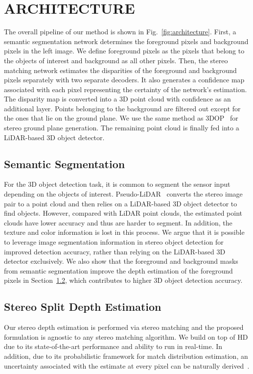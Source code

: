 \documentclass[letterpaper, 10 pt, conference]{ieeeconf}
\begin{document}
\section{ARCHITECTURE}\label{Approach}
The overall pipeline of our method is shown in Fig.~\ref{fig:architecture}. First, a semantic segmentation network determines the foreground pixels and background pixels in the left image. We define foreground pixels as the pixels that belong to the objects of interest and background as all other pixels. Then, the stereo matching network estimates the disparities of the foreground and background pixels separately with two separate decoders. It also generates a confidence map associated with each pixel representing the certainty of the network's estimation. The disparity map is converted into a 3D point cloud with confidence as an additional layer. Points belonging to the background are filtered out except for the ones that lie on the ground plane. We use the same method as 3DOP~\cite{chen20153d} for stereo ground plane generation. The remaining point cloud is finally fed into a LiDAR-based 3D object detector.

\subsection{Semantic Segmentation}
For the 3D object detection task, it is common to segment the sensor input depending on the objects of interest. Pseudo-LiDAR~\cite{wang2019pseudo, you2019pseudo} converts the stereo image pair to a point cloud and then relies on a LiDAR-based 3D object detector to find objects. However, compared with LiDAR point clouds, the estimated point clouds have lower accuracy and thus are harder to segment. In addition, the texture and color information is lost in this process. We argue that it is possible to leverage image segmentation information in stereo object detection for improved detection accuracy, rather than relying on the LiDAR-based 3D detector exclusively. We also show that the foreground and background masks from semantic segmentation improve the depth estimation of the foreground pixels in Section~\ref{depth estimation}, which contributes to higher 3D object detection accuracy.

\subsection{Stereo Split Depth Estimation}\label{depth estimation} 
Our stereo depth estimation is performed via stereo matching and the proposed formulation is agnostic to any stereo matching algorithm. We build on top of HD due to its state-of-the-art performance and ability to run in real-time. In addition, due to its probabilistic framework for match distribution estimation, an uncertainty associated with the estimate at every pixel can be naturally derived~\cite{yin2019hd3}. \\
\end{document}
